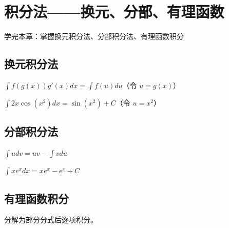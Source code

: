 \chapter{积分法——换元、分部、有理函数}
\begin{applicationbox}
学完本章：掌握换元积分法、分部积分法、有理函数积分
\end{applicationbox}

\section{换元积分法} \(\int f(g(x))g'(x)dx = \int f(u)du\)（令 \(u=g(x)\)）

\begin{examplebox}[1] \(\int 2x\cos(x^2)dx = \sin(x^2)+C\)（令 \(u=x^2\)）\end{examplebox}

\section{分部积分法} \(\int u dv = uv - \int v du\)

\begin{examplebox}[2] \(\int x e^x dx = x e^x - e^x + C\)\end{examplebox}

\section{有理函数积分} 分解为部分分式后逐项积分。

